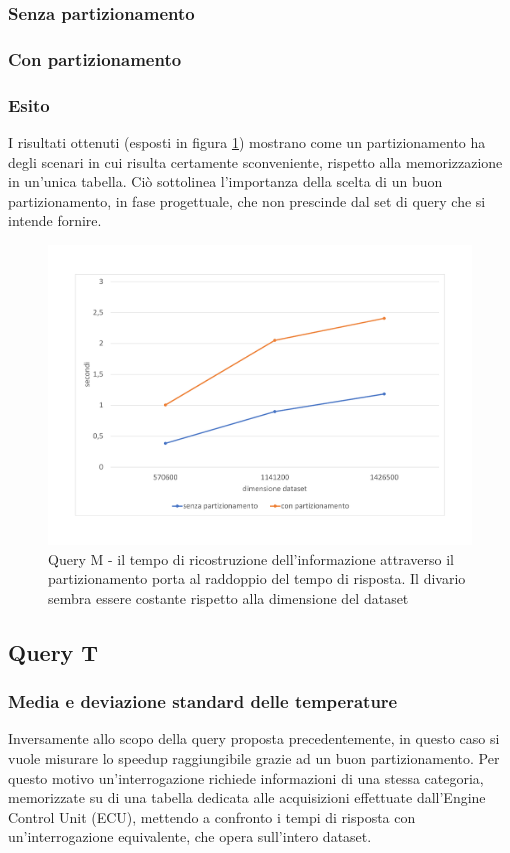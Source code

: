 \subsubsection{Senza partizionamento}

\subsubsection{Con partizionamento}

\subsubsection{Esito}
I risultati ottenuti (esposti in figura \ref{fig:querym}) mostrano come un partizionamento ha degli scenari in cui risulta certamente sconveniente, rispetto alla memorizzazione in un'unica tabella. Ciò sottolinea l'importanza della scelta di un buon partizionamento, in fase progettuale, che non prescinde dal set di query che si intende fornire.
\begin{figure}
	\centering
	\includegraphics[width=1.0\linewidth]{figures/query_M}
	\caption{Query M - il tempo di ricostruzione dell'informazione attraverso il partizionamento porta al raddoppio del tempo di risposta. Il divario sembra essere costante rispetto alla dimensione del dataset}
	\label{fig:querym}
\end{figure}
\newpage
\subsection{Query T}
\subsubsection{Media e deviazione standard delle temperature}
Inversamente allo scopo della query proposta precedentemente, in questo caso si vuole misurare lo speedup raggiungibile grazie ad un buon partizionamento. Per questo motivo un'interrogazione richiede informazioni di una stessa categoria, memorizzate su di una tabella dedicata alle acquisizioni effettuate dall'Engine Control Unit (ECU), mettendo a confronto i tempi di risposta con un'interrogazione equivalente, che opera sull'intero dataset.
